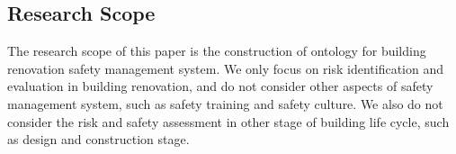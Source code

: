 
\subsection*{Research Scope}
\label{sec:research_scope}
The research scope of this paper is the construction of ontology for building renovation safety management system. 
We only focus on risk identification and evaluation in building renovation, and do not consider other aspects of safety management system, such as safety training and safety culture.
We also do not consider the risk and safety assessment in other stage of building life cycle, such as design and construction stage.



